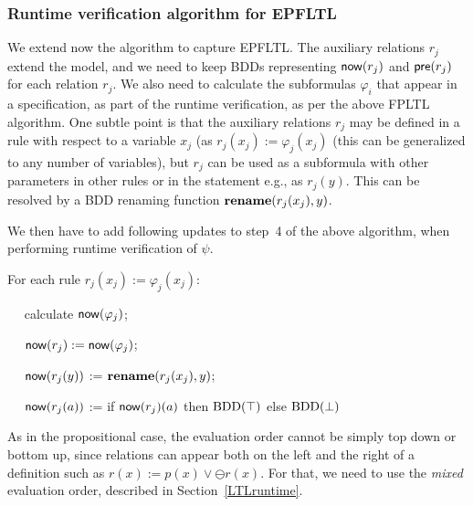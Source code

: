 \subsubsection{Runtime verification algorithm for EPFLTL}

We extend now the algorithm to capture EPFLTL.
The auxiliary relations $r_j$ extend the model, and we need to keep 
BDDs representing $\mathsf{now} ( r_j )$ and
$\mathsf{pre} (r_j)$ for each relation $r_j$. We also need to calculate the 
subformulas $\varphi_i$ that appear in
a specification, as part of the runtime verification,
as per the above FPLTL algorithm. One subtle point is that the auxiliary 
relations $r_j$ may be defined in a rule with respect to
a variable $x_j$ (as $r_j (x_j ):= \varphi_j (x_j)$ (this can be generalized 
to any number of variables), but $r_j$ can be used
as a subformula with other parameters in other rules or in the statement e.g., 
as $r_j ( y )$. This can be resolved by a BDD renaming function 
$\mathbf{rename} ( r_j (x_j ) , y)$.


We then have to add
following updates to step~4 of the above algorithm, when performing runtime verification of
$\psi$. 

\noindent \begin{description}
\item For each rule 
$r_j ( x_j ) := \varphi_j ( x_j )$:
\item{\ \ }  calculate $\mathsf{now} ( \varphi_j )$;
\item{\ \ }  $\mathsf{now} ( r_j )  := \mathsf{now} (\varphi_j)$;
\item{\ \ } $\mathsf{now} ( r_j ( y ) )$ := $\mathbf{rename} ( r_j(x_j) ,  y )$;
\item{\ \ } $\mathsf{now} ( r_j ( a ) )$ := if $\mathsf{now} ( r_j ) ( a )$
then $\mathrm{BDD}(\top)$ else $\mathrm{BDD}(\bot)$
\end{description}


\noindent
As in the propositional case, the evaluation order cannot be
simply top down or bottom up, since relations can appear
both on the left and the right of a definition
such as $r ( x ) := p ( x ) \vee \ominus r ( x )$. For that,
we need to use the {\em mixed} evaluation order, described in Section~\ref{LTLruntime}.













